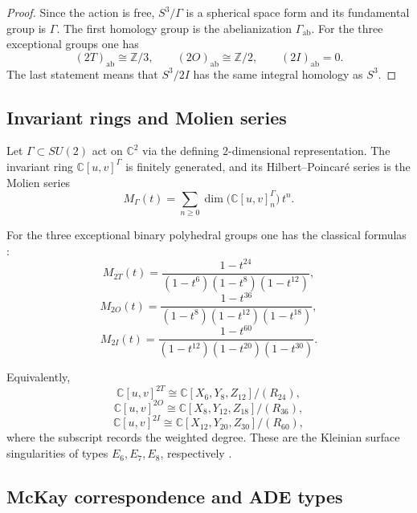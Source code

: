 \documentclass[11pt]{article}
\begin{document}
\begin{proof}
Since the action is free, \(S^3/\Gamma\) is a spherical space form and its fundamental
group is \(\Gamma\). The first homology group is the abelianization \(\Gamma_{\mathrm{ab}}\).
For the three exceptional groups one has
\[
(2T)_{\mathrm{ab}}\cong \mathbb Z/3,\qquad
(2O)_{\mathrm{ab}}\cong \mathbb Z/2,\qquad
(2I)_{\mathrm{ab}}=0.
\]
The last statement means that \(S^3/2I\) has the same integral homology as \(S^3\).
\end{proof}

\subsection{Invariant rings and Molien series}
\label{p1:sec:molien-exceptional}

Let \(\Gamma\subset SU(2)\) act on \(\mathbb C^2\) via the defining \(2\)-dimensional
representation. The invariant ring \(\mathbb C[u,v]^\Gamma\) is finitely generated, and
its Hilbert--Poincar\'e series is the Molien series
\[
M_\Gamma(t)=\sum_{n\ge 0}\dim\!\bigl(\mathbb C[u,v]^\Gamma_n\bigr)\,t^n.
\]

For the three exceptional binary polyhedral groups one has the classical formulas \cite{Klein1884,McKay1980,Slodowy1980,conwaysmith2003quaternions}:
\begin{equation}
\label{p1:eq:molien-2T}
M_{2T}(t)=\frac{1-t^{24}}{(1-t^6)(1-t^8)(1-t^{12})},
\end{equation}
\begin{equation}
\label{p1:eq:molien-2O}
M_{2O}(t)=\frac{1-t^{36}}{(1-t^8)(1-t^{12})(1-t^{18})},
\end{equation}
\begin{equation}
\label{p1:eq:molien-2I}
M_{2I}(t)=\frac{1-t^{60}}{(1-t^{12})(1-t^{20})(1-t^{30})}.
\end{equation}

Equivalently,
\[
\mathbb C[u,v]^{2T}\cong \mathbb C[X_6,Y_8,Z_{12}]/(R_{24}),
\]
\[
\mathbb C[u,v]^{2O}\cong \mathbb C[X_8,Y_{12},Z_{18}]/(R_{36}),
\]
\[
\mathbb C[u,v]^{2I}\cong \mathbb C[X_{12},Y_{20},Z_{30}]/(R_{60}),
\]
where the subscript records the weighted degree.
These are the Kleinian surface singularities of types \(E_6,E_7,E_8\), respectively \cite{Klein1884,Slodowy1980}.

\subsection{McKay correspondence and ADE types}
\label{p1:sec:mckay-ade}
\end{document}
